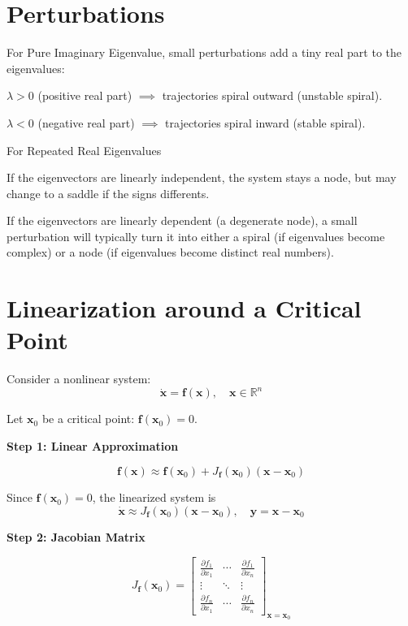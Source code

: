 \section*{Perturbations}

For Pure Imaginary Eigenvalue,
small perturbations add a tiny real part to the eigenvalues:

\begin{tightitemize}
    \item $\lambda > 0$ (positive real part) $\implies$ trajectories spiral outward (unstable spiral).
    \item $\lambda < 0$ (negative real part) $\implies$ trajectories spiral inward (stable spiral).
\end{tightitemize}

For Repeated Real Eigenvalues

\begin{tightitemize}
    \item If the eigenvectors are linearly independent, the system stays a node, but may change to a saddle if the signs differents.
    \item If the eigenvectors are linearly dependent (a degenerate node),
    a small perturbation will typically turn it into either a spiral
    (if eigenvalues become complex) or a node
    (if eigenvalues become distinct real numbers).
\end{tightitemize}

\section*{Linearization around a Critical Point}

Consider a nonlinear system:
\[
\dot{\mathbf{x}} = \mathbf{f}(\mathbf{x}), \quad \mathbf{x} \in \mathbb{R}^n
\]

Let $\mathbf{x}_0$ be a critical point: $\mathbf{f}(\mathbf{x}_0) = 0$.

\textbf{Step 1: Linear Approximation}

\[
\mathbf{f}(\mathbf{x}) \approx \mathbf{f}(\mathbf{x}_0) + J_{\mathbf{f}}(\mathbf{x}_0)(\mathbf{x} - \mathbf{x}_0)
\]

Since $\mathbf{f}(\mathbf{x}_0) = 0$, the linearized system is
\[
\dot{\mathbf{x}} \approx J_{\mathbf{f}}(\mathbf{x}_0) (\mathbf{x} - \mathbf{x}_0), \quad
\mathbf{y} = \mathbf{x} - \mathbf{x}_0
\]

\textbf{Step 2: Jacobian Matrix}

\[
J_{\mathbf{f}}(\mathbf{x}_0) =
\begin{bmatrix}
\frac{\partial f_1}{\partial x_1} & \cdots & \frac{\partial f_1}{\partial x_n} \\
\vdots & \ddots & \vdots \\
\frac{\partial f_n}{\partial x_1} & \cdots & \frac{\partial f_n}{\partial x_n}
\end{bmatrix}_{\mathbf{x} = \mathbf{x}_0}
\]

